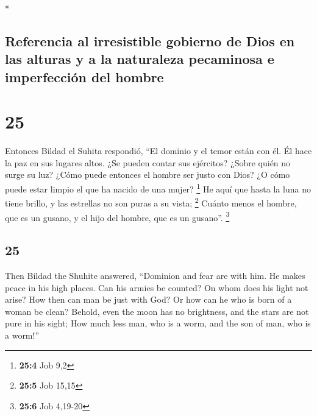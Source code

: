 \begin{paracol}{2}
\begin{otherlanguage}{english}
\end{otherlanguage}

\switchcolumn[0]*

\hypertarget{referencia-al-irresistible-gobierno-de-dios-en-las-alturas-y-a-la-naturaleza-pecaminosa-e-imperfecciuxf3n-del-hombre}{%
\subsection{Referencia al irresistible gobierno de Dios en las alturas y
a la naturaleza pecaminosa e imperfección del
hombre}\label{referencia-al-irresistible-gobierno-de-dios-en-las-alturas-y-a-la-naturaleza-pecaminosa-e-imperfecciuxf3n-del-hombre}}

\hypertarget{section-48}{%
\section{25}\label{section-48}}

 Entonces Bildad el Suhita respondió,  ``El
dominio y el temor están con él. Él hace la paz en sus lugares altos.
 ¿Se pueden contar sus ejércitos? ¿Sobre quién no surge su
luz?  ¿Cómo puede entonces el hombre ser justo con Dios?
¿O cómo puede estar limpio el que ha nacido de una mujer? \footnote{\textbf{25:4}
  Job 9,2}  He aquí que hasta la luna no tiene brillo, y
las estrellas no son puras a su vista; \footnote{\textbf{25:5} Job 15,15}
 Cuánto menos el hombre, que es un gusano, y el hijo del
hombre, que es un gusano''. \footnote{\textbf{25:6} Job 4,19-20}

\switchcolumn
\begin{otherlanguage}{english}

\hypertarget{section-49}{%
\section{25}\label{section-49}}

 Then Bildad the Shuhite answered, 
``Dominion and fear are with him. He makes peace in his high places.
 Can his armies be counted? On whom does his light not
arise?  How then can man be just with God? Or how can he
who is born of a woman be clean?  Behold, even the moon
has no brightness, and the stars are not pure in his sight;
 How much less man, who is a worm, and the son of man, who
is a worm!''


\end{otherlanguage}
\end{paracol}
